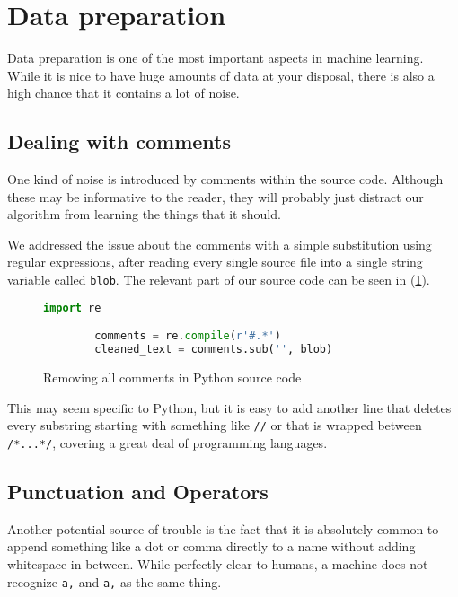 \section{Data preparation} \label{sec:data_preparation}

  Data preparation is one of the most important aspects in machine
  learning.  While it is nice to have huge amounts of data at your
  disposal, there is also a high chance that it contains a lot of noise.

  \subsection{Dealing with comments} \label{sub:dealing_with_comments}

    One kind of noise is introduced by comments within the source
    code. Although these may be informative to the reader, they will
    probably just distract our algorithm from learning the things that
    it should.

    We addressed the issue about the comments with a simple substitution
    using regular expressions, after reading every single source file
    into a single string variable called \verb+blob+. The relevant part
    of our source code can be seen in (\ref{fig:comments}).

    \begin{figure}[htpb]
      \centering \begin{lstlisting}[language=Python]
        import re

        comments = re.compile(r'#.*')
        cleaned_text = comments.sub('', blob) \end{lstlisting} 
        \caption{Removing all comments in Python source
      code} \label{fig:comments}
    \end{figure}

    This may seem specific to Python, but it is easy to add another line
    that deletes every substring starting with something like \verb+//+
    or that is wrapped between \verb+/*...*/+, covering a great deal of
    programming languages.

  \subsection{Punctuation and Operators}
  \label{sub:punctuation_and_operators}

    Another potential source of trouble is the fact that it is
    absolutely common to append something like a dot or comma directly
    to a name without adding whitespace in between. While perfectly
    clear to humans, a machine does not recognize \verb+a,+ and
    \verb+a+\textvisiblespace\verb+,+ as the same thing.


